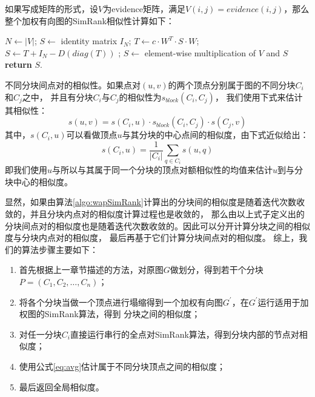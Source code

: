 \documentclass[master]{njuthesis}
\begin{document}
如果写成矩阵的形式，设$V$为evidence矩阵，满足$V(i,j)=evidence(i,j)$，那么整个加权有向图的SimRank相似性计算如下：
\begin{algorithm}[h]
\label{algo:wapSimRank}
\begin{algorithmic}[1]
	\State $N \gets |V|$;
	\State $S \gets$ identity matrix $I_N$;
		\State $T \gets c\cdot W^T \cdot S \cdot W$;
		\State $S \gets T + I_N -D(diag(T))$ ;
	\EndFor
	\State $S \gets$ element-wise multiplication of $V$ and $S$
	\State \textbf{return} $S$.
\EndProcedure
\end{algorithmic}
\end{algorithm}
\begin{definition}
 不同分块间点对的相似性。如果点对$(u,v)$的两个顶点分别属于图的不同分块$C_i$和$C_j$之中，
 并且有分块$C_i$与$C_j$的相似性为$s_{block}(C_i, C_j)$，
 我们使用下式来估计其相似性：
 \begin{equation}
 \label{eq:avg}
    s(u,v) = s(C_i, u) \cdot s_{block}(C_i, C_j) \cdot s(C_j, v)
   \end{equation}
  其中，$s(C_i, u)$可以看做顶点$u$与其分块的中心点间的相似度，由下式近似给出：
  \begin{equation}
    s(C_i, u) = \frac{1}{|C_i|}\sum_{q \in C_i}{s(u,q)}
   \end{equation}
   即我们使用$u$与所以与其属于同一个分块的顶点对额相似性的均值来估计$u$到与分块中心的相似度。
\end{definition}
显然，如果由算法\ref{algo:wapSimRank}计算出的分块间的相似度是随着迭代次数收敛的，并且分块内点对的相似度计算过程也是收敛的，
那么由以上式子定义出的分块间点对的相似度也是随着迭代次数收敛的。因此可以分开计算分块之间的相似度与分块内点对的相似度，
最后再基于它们计算分块间点对的相似度。
综上，我们的算法步骤主要如下：
\begin{enumerate}
 \item 首先根据上一章节描述的方法，对原图$G$做划分，得到若干个分块$P=(C_1, C_2, \dots, C_n)$；
 \item 将各个分块当做一个顶点进行塌缩得到一个加权有向图$G^\prime$，在$G^\prime$运行适用于加权图的SimRank算法，得到
 分块之间的相似度；
 \item 对任一分块$C_i$直接运行串行的全点对SimRank算法，得到分块内部的节点对相似度；
 \item 使用公式\ref{eq:avg}估计属于不同分块顶点之间的相似度；
 \item 最后返回全局相似度。
\end{enumerate}
\end{document}

